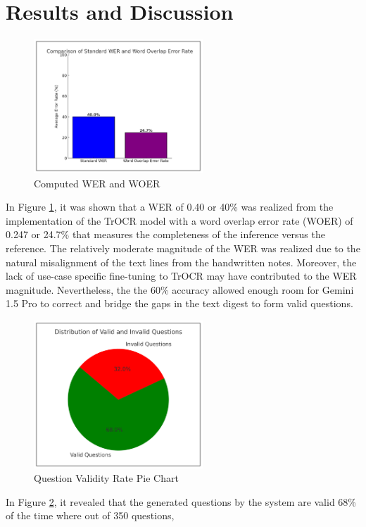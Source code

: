 \documentclass[conference]{IEEEtran}
\begin{document}
\section{Results and Discussion}
\begin{figure}[H]
    \centerline{\includegraphics[width=2.5in]{wer.png}}
    \vspace{-0.4cm}
    \caption{Computed WER and WOER} 
    \label{wer}
    \end{figure}
\indent In Figure \ref{wer}, it was shown that a WER of 0.40 or 40\% 
was realized from the implementation of the TrOCR model with a 
word overlap error rate (WOER) of 0.247 or 24.7\% that 
measures the completeness of the inference versus the reference.
The relatively moderate magnitude of the WER was realized due to the 
natural misalignment of the text lines from the handwritten notes. 
Moreover, the lack of use-case specific fine-tuning to TrOCR 
may have contributed to the WER magnitude. Nevertheless, the
the 60\% accuracy allowed enough room for Gemini 1.5 Pro to correct 
and bridge the gaps in the text digest to form valid questions.
\begin{figure}[H]
    \centerline{\includegraphics[width=2.5in]{validity.png}}
    \vspace{-0.5cm}
    \caption{Question Validity Rate Pie Chart} 
    \label{validity}
    \end{figure}
\indent In Figure \ref{validity}, it revealed that the generated questions 
by the system are valid 68\% of the time where out of 350 questions, 
\end{document}
